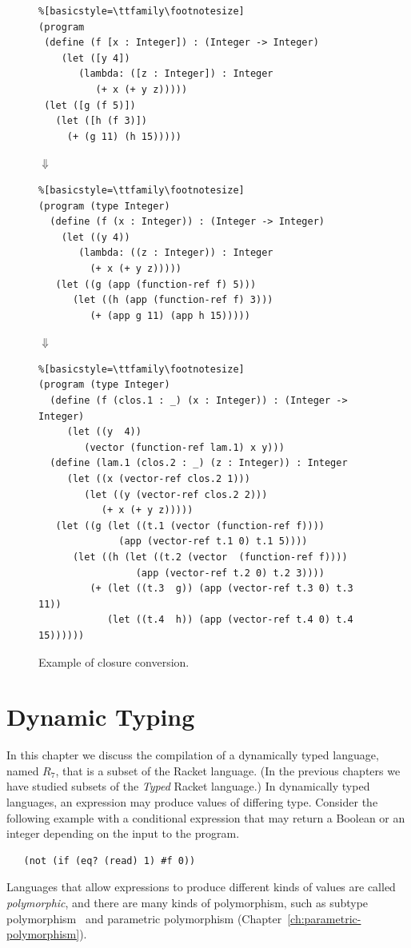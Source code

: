 \documentclass[11pt]{book}
\begin{document}
\begin{figure}[h]
\begin{minipage}{0.8\textwidth}
\begin{lstlisting}%[basicstyle=\ttfamily\footnotesize]
(program
 (define (f [x : Integer]) : (Integer -> Integer)
    (let ([y 4])
       (lambda: ([z : Integer]) : Integer
          (+ x (+ y z)))))
 (let ([g (f 5)])
   (let ([h (f 3)])
     (+ (g 11) (h 15)))))
\end{lstlisting}
$\Downarrow$
\begin{lstlisting}%[basicstyle=\ttfamily\footnotesize]
(program (type Integer)
  (define (f (x : Integer)) : (Integer -> Integer)
    (let ((y 4))
       (lambda: ((z : Integer)) : Integer
         (+ x (+ y z)))))
   (let ((g (app (function-ref f) 5)))
      (let ((h (app (function-ref f) 3)))
         (+ (app g 11) (app h 15)))))
\end{lstlisting}
$\Downarrow$
\begin{lstlisting}%[basicstyle=\ttfamily\footnotesize]
(program (type Integer)
  (define (f (clos.1 : _) (x : Integer)) : (Integer -> Integer)
     (let ((y  4))
        (vector (function-ref lam.1) x y)))
  (define (lam.1 (clos.2 : _) (z : Integer)) : Integer
     (let ((x (vector-ref clos.2 1)))
        (let ((y (vector-ref clos.2 2)))
           (+ x (+ y z)))))
   (let ((g (let ((t.1 (vector (function-ref f))))
              (app (vector-ref t.1 0) t.1 5))))
      (let ((h (let ((t.2 (vector  (function-ref f))))
                 (app (vector-ref t.2 0) t.2 3))))
         (+ (let ((t.3  g)) (app (vector-ref t.3 0) t.3 11))
            (let ((t.4  h)) (app (vector-ref t.4 0) t.4 15))))))
\end{lstlisting}
\end{minipage}

\caption{Example of closure conversion.}
\label{fig:lexical-functions-example}
\end{figure}


\chapter{Dynamic Typing}
\label{ch:type-dynamic}

In this chapter we discuss the compilation of a dynamically typed
language, named $R_7$, that is a subset of the Racket language. (In
the previous chapters we have studied subsets of the \emph{Typed}
Racket language.) In dynamically typed languages, an expression may
produce values of differing type. Consider the following example with
a conditional expression that may return a Boolean or an integer
depending on the input to the program.
\begin{lstlisting}
   (not (if (eq? (read) 1) #f 0))
\end{lstlisting}
Languages that allow expressions to produce different kinds of values
are called \emph{polymorphic}, and there are many kinds of
polymorphism, such as subtype polymorphism~\citep{Cardelli:1985kx} and
parametric polymorphism (Chapter~\ref{ch:parametric-polymorphism}).
\end{document}
